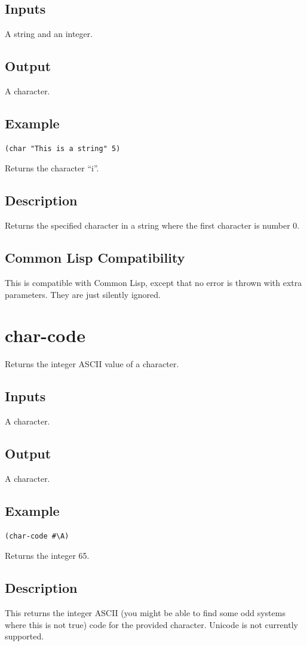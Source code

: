 \documentclass[10pt, openany]{book}
\newcommand{\cl}{Common Lisp}
\begin{document}
\subsection{Inputs}
A string and an integer.
\subsection{Output}
A character.
\subsection{Example}
\begin{lstlisting}
(char "This is a string" 5)
\end{lstlisting}
Returns the character ``i''.
\subsection{Description}
Returns the specified character in a string where the first character is number 0.
\subsection{Common Lisp Compatibility}
This is compatible with \cl, except that no error is thrown with extra parameters.  They are just silently ignored.

\section{char-code}
Returns the integer ASCII value of a character.
\subsection{Inputs}
A character.
\subsection{Output}
A character.
\subsection{Example}
\begin{lstlisting}
(char-code #\A)
\end{lstlisting}
Returns the integer 65.
\subsection{Description}
This returns the integer ASCII (you might be able to find some odd systems where this is not true) code for the provided character.  Unicode is not currently supported.
\end{document}

